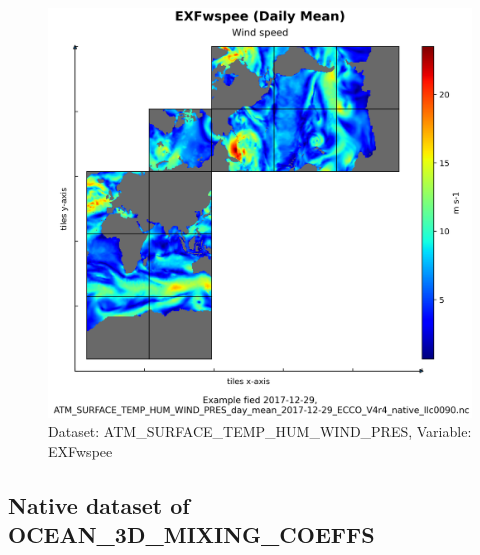 \begin{figure}[H]
\centering
\includegraphics[scale=0.55]{../images/plots/native_plots/Atmosphere_Surface_Temperature_Humidity_Wind_and_Pressure/EXFwspee.png}
\caption{Dataset: ATM\_SURFACE\_TEMP\_HUM\_WIND\_PRES, Variable: EXFwspee}
\label{tab:table-ATM_SURFACE_TEMP_HUM_WIND_PRES_EXFwspee-Plot}
\end{figure}
\subsection{Native dataset of OCEAN\_3D\_MIXING\_COEFFS}
\newp

